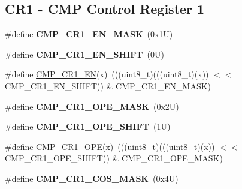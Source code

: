 \subsection*{C\+R1 -\/ C\+MP Control Register 1}
\begin{DoxyCompactItemize}
\item 
\mbox{\label{group___c_m_p___register___masks_ga2492ad39a9661a1217cc26f20bd31ef2}} 
\#define {\bfseries C\+M\+P\+\_\+\+C\+R1\+\_\+\+E\+N\+\_\+\+M\+A\+SK}~(0x1\+U)
\item 
\mbox{\label{group___c_m_p___register___masks_gacaacf0894bdf41eb49de1ae81075fa2b}} 
\#define {\bfseries C\+M\+P\+\_\+\+C\+R1\+\_\+\+E\+N\+\_\+\+S\+H\+I\+FT}~(0\+U)
\item 
\#define \mbox{\hyperlink{group___c_m_p___register___masks_ga1f0fd12e9a61eced3f9d44e58269539e}{C\+M\+P\+\_\+\+C\+R1\+\_\+\+EN}}(x)~(((uint8\+\_\+t)(((uint8\+\_\+t)(x)) $<$$<$ C\+M\+P\+\_\+\+C\+R1\+\_\+\+E\+N\+\_\+\+S\+H\+I\+FT)) \& C\+M\+P\+\_\+\+C\+R1\+\_\+\+E\+N\+\_\+\+M\+A\+SK)
\item 
\mbox{\label{group___c_m_p___register___masks_gaaad42787753465406dd5006f228049dd}} 
\#define {\bfseries C\+M\+P\+\_\+\+C\+R1\+\_\+\+O\+P\+E\+\_\+\+M\+A\+SK}~(0x2\+U)
\item 
\mbox{\label{group___c_m_p___register___masks_ga5c273c5f23e09e69a9589a285cbe2c24}} 
\#define {\bfseries C\+M\+P\+\_\+\+C\+R1\+\_\+\+O\+P\+E\+\_\+\+S\+H\+I\+FT}~(1\+U)
\item 
\#define \mbox{\hyperlink{group___c_m_p___register___masks_gac2c253d65771b16bf9124105672e5fbd}{C\+M\+P\+\_\+\+C\+R1\+\_\+\+O\+PE}}(x)~(((uint8\+\_\+t)(((uint8\+\_\+t)(x)) $<$$<$ C\+M\+P\+\_\+\+C\+R1\+\_\+\+O\+P\+E\+\_\+\+S\+H\+I\+FT)) \& C\+M\+P\+\_\+\+C\+R1\+\_\+\+O\+P\+E\+\_\+\+M\+A\+SK)
\item 
\mbox{\label{group___c_m_p___register___masks_gaf8b38740c4bddec386b2b7d674f5f0fc}} 
\#define {\bfseries C\+M\+P\+\_\+\+C\+R1\+\_\+\+C\+O\+S\+\_\+\+M\+A\+SK}~(0x4\+U)
\item 
\mbox{\label{group___c_m_p___register___masks_gaaf826df5b4ff2069e2cb112f03c7b782}} 

\end{DoxyCompactItemize}
